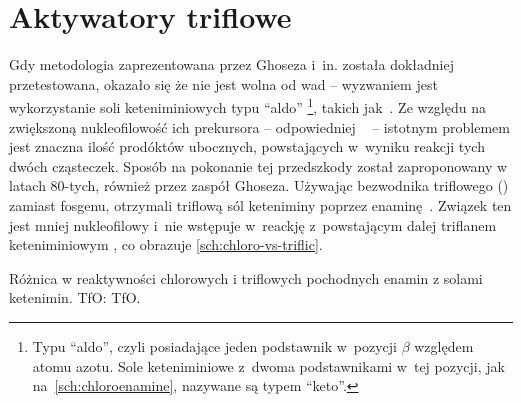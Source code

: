 \section{Aktywatory triflowe}
Gdy metodologia zaprezentowana przez Ghoseza i~in. została dokładniej przetestowana, okazało się że nie jest wolna od wad \---
  wyzwaniem jest wykorzystanie soli keteniminiowych typu \enquote{aldo}%
  \footnote{%
    Typu \enquote{aldo}, czyli posiadające jeden podstawnik w~pozycji $\beta$ względem atomu azotu.
    Sole keteniminiowe z~dwoma podstawnikami w~tej pozycji, jak na~\cref{sch:chloroenamine}, nazywane są typem \enquote{keto}.%
  }, takich jak~.
Ze względu na zwiększoną nukleofilowość ich prekursora \--- odpowiedniej ~ \---
  istotnym problemem jest znaczna ilość prodóktów ubocznych, powstających w~wyniku reakcji tych dwóch cząsteczek.
Sposób na pokonanie tej przedszkody został zaproponowany w latach 80-tych, również przez zaspół Ghoseza.
Używając bezwodnika triflowego () zamiast fosgenu,
  otrzymali triflową sól keteniminy poprzez enaminę~\autocite{ghosez81}.
Związek ten jest mniej nukleofilowy i~nie wstępuje w~reackję z~powstającym dalej triflanem keteniminiowym ,
  co obrazuje \cref{sch:chloro-vs-triflic}.
\begin{scheme*}
  \centering
  
  \caption{Różnica w reaktywności chlorowych i triflowych pochodnych enamin z solami ketenimin. \acrshort{TfO}: \acrlong{TfO}.}
  \label{sch:chloro-vs-triflic}
\end{scheme*}

